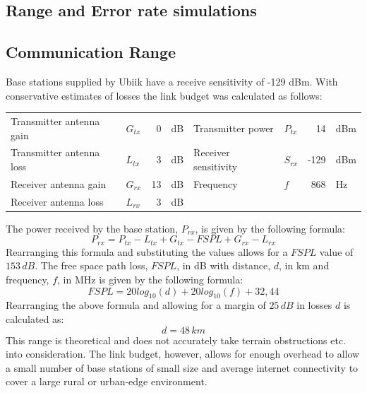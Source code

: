 \documentclass[12pt]{article}
\begin{document}
\subsection{Range and Error rate simulations}

\subsection{Communication Range}
Base stations supplied by Ubiik have a receive sensitivity of -129 dBm. With conservative estimates of losses the link
budget was calculated as follows:


\begin{table}[!htp]
\begin{tabular}{|l|l|rl|l|l|rl|}
\hline
Transmitter antenna gain & $G_{tx}$ & 0&dB & Transmitter power & $P_{tx}$ & 14&dBm \\
Transmitter antenna loss & $L_{tx}$ & 3&dB & Receiver sensitivity & $S_{rx}$ & -129&dBm \\
Receiver antenna gain & $G_{rx}$ & 13&dB & Frequency & $f$ & 868&Hz \\
Receiver antenna loss & $L_{rx}$ & 3&dB &&&&\\
\hline
\end{tabular}
\end{table}

The power received by the base station, $P_{rx}$, is given by the following formula:
\[P_{rx} = P_{tx} - L_{tx} + G_{tx} - FSPL + G_{rx} - L_{rx}\]
Rearranging this formula and substituting the values allows for a $FSPL$ value of $153\,dB$.
The free space path loss, $FSPL$, in dB with distance, $d$, in km and frequency, $f$, in MHz is given by the following 
formula:
\[FSPL = 20log_{10}(d) + 20log_{10}(f) + 32,44\] %
Rearranging the above formula and allowing for a margin of $25\,dB$ in losses $d$ is calculated as:
\[d = 48\,km\]
This range is theoretical and does not accurately take terrain obstructions etc. into consideration. The link budget, 
however, allows for enough overhead to allow a small number of base stations of small size and average internet connectivity
to cover a large rural or urban-edge environment.
\end{document}
